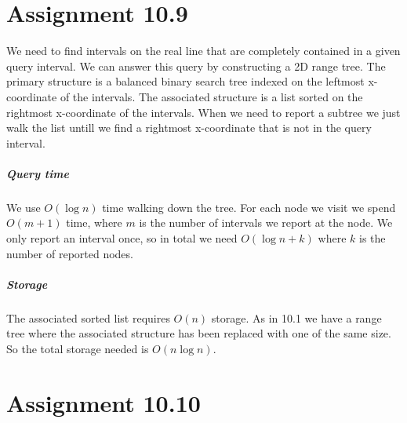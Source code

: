\documentclass[10pt,a4paper,final,oneside,openany,article]{memoir}
\begin{document}
\chapter*{Assignment 10.9}
We need to find intervals on the real line that are completely contained in a given query interval. We can answer this query by constructing a 2D range tree. The primary structure is a balanced binary search tree indexed on the leftmost x-coordinate of the intervals. The associated structure is a list sorted on the rightmost x-coordinate of the intervals. When we need to report a subtree we just walk the list untill we find a rightmost x-coordinate that is not in the query interval.

\paragraph{Query time}
We use $O(\log n)$ time walking down the tree. For each node we visit we spend $O(m + 1)$ time, where $m$ is the number of intervals we report at the node. We only report an interval once, so in total we need $O(\log n + k)$ where $k$ is the number of reported nodes.

\paragraph{Storage}
The associated sorted list requires $O(n)$ storage. As in 10.1 we have a range tree where the associated structure has been replaced with one of the same size. So the total storage needed is $O(n \log n)$.


\chapter*{Assignment 10.10}

\printbibliography
\end{document}

